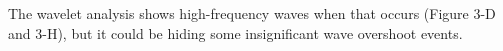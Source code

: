 \documentclass[tesis.tex]{subfiles}
\begin{document}
    

The wavelet analysis shows high-frequency waves when that occurs (Figure 3-D and 3-H), but it could be hiding some insignificant wave overshoot events.
\end{document}

